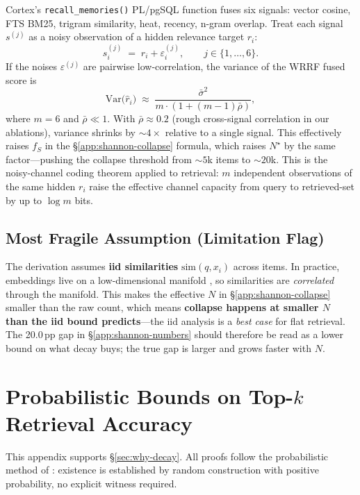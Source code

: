 \documentclass[11pt]{article}
\begin{document}
Cortex's \texttt{recall\_memories()} PL/pgSQL function fuses six
signals: vector cosine, FTS BM25, trigram similarity, heat,
recency, n-gram overlap.  Treat each signal $s^{(j)}$ as a noisy
observation of a hidden relevance target $r_i$:
\[
s_i^{(j)} \;=\; r_i + \varepsilon_i^{(j)},
\qquad j \in \{1, \dots, 6\}.
\]
If the noises $\varepsilon^{(j)}$ are pairwise low-correlation, the
variance of the WRRF fused score is
\begin{equation}
\mathrm{Var}\big(\hat r_i\big) \;\approx\;
\frac{\bar\sigma^2}{m \cdot (1 + (m-1)\bar\rho)},
\label{eq:wrrf-var}
\end{equation}
where $m=6$ and $\bar\rho \ll 1$.  With $\bar\rho \approx 0.2$
(rough cross-signal correlation in our ablations), variance shrinks
by ${\sim}4\times$ relative to a single signal.  This effectively
raises $f_S$ in the \S\ref{app:shannon-collapse} formula, which
raises $N^\star$ by the same factor---pushing the collapse
threshold from ${\sim}5$k items to ${\sim}20$k.  This is the
noisy-channel coding theorem \citep{Shannon1948} applied to
retrieval: $m$ independent observations of the same hidden $r_i$
raise the effective channel capacity from query to retrieved-set
by up to $\log m$ bits.

\subsection{Most Fragile Assumption (Limitation Flag)}
\label{app:shannon-limit}

The derivation assumes \textbf{iid similarities}
$\mathrm{sim}(q, x_i)$ across items.  In practice, embeddings live
on a low-dimensional manifold \citep{Reimers2019,Ethayarajh2019},
so similarities are \emph{correlated} through the manifold.  This
makes the effective $N$ in \S\ref{app:shannon-collapse} smaller
than the raw count, which means \textbf{collapse happens at smaller
$N$ than the iid bound predicts}---the iid analysis is a
\emph{best case} for flat retrieval.  The 20.0\,pp gap in
\S\ref{app:shannon-numbers} should therefore be read as a lower
bound on what decay buys; the true gap is larger and grows faster
with $N$.

\section{Probabilistic Bounds on Top-$k$ Retrieval Accuracy}
\label{app:erdos}

This appendix supports \S\ref{sec:why-decay}.  All proofs follow
the probabilistic method of \citet{ErdosSpencer1974}: existence is
established by random construction with positive probability, no
explicit witness required.
\end{document}
